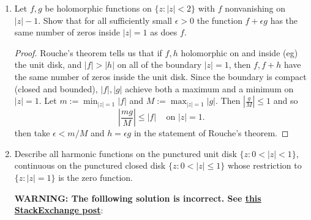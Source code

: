\documentclass{article}
\begin{document}
\begin{enumerate}
\begin{proof}
	The same computation shows that 
	\[ \left | \int_{C^+_{\epsilon}} f(z) dz \right | \leq \pi \epsilon^{5/4}/(\epsilon^2+1)\]
	as $\epsilon \rightarrow 0$, the numerator vanishes and the denominator $\rightarrow 1$.
	So
	\[ \pi i^{1/4} = \int_{\gamma_{\infty, 0}} f(z) dz = \int_{-\infty}^0 f dz + \int_0^\infty f dz \]
	A change of variables gives us 
	\[ \int_{-\infty}^0 f(z) dz = \int_{\infty}^0 f(-z) (-1) dz = \int_0^\infty f(-z) dz.\]
	But $f(-z) = (-1)^{1/4} f(z)$ so we get 
	\[ \pi i^{1/4} = \left ( (-1)^{1/4} _1 \right ) \int_0^\infty f(z) dz \]
	so 
	\begin{align*}
		\int_0^\infty f(z) dz = \pi i^{1/4}/ ((-1)^1/4 + 1) &= \pi \frac{i^{1/4}}{i^{1/2} +1}\\
		&=\pi/(i^{1/4} + i^{-1/4})
	\end{align*}
	But note that 
	\[i^{1/4} = \cos (\pi/8) + i \sin (\frac{\pi}{8})\]
	\[i^{-1/4} = \cos (\pi/8) - i \sin (\pi/8) \]
	so
	\[ \int_0^\infty f(z) dz = \boxed{\frac{\pi}{2 \cos(\pi/8)}}\]
	
	\end{proof}
	
	\item Let $f, g$ be holomorphic functions on $\{z : |z| < 2\}$ with $f$ nonvanishing on $|z| - 1$. 
	Show that for all sufficiently small $\epsilon > 0$ the function $f + \epsilon g$ has the same number of zeros inside $|z| = 1$ 
	as does $f$.
	
	\begin{proof}
	Rouche's theorem tells us that if $f,h$ holomorphic on and inside (eg) the unit disk, and $|f|>|h|$ on
	all of the boundary $|z|=1$, then $f, f+h$ have the same number of zeros inside the unit disk.
	Since the boundary is compact (closed and bounded), $|f|,|g|$ achieve both a maximum and a 
	minimum on $|z|=1$. Let $m:= \min_{|z|=1} |f|$ and $M:= \max_{|z|=1} |g|$. Then $|\frac{g}{M}| \leq 1$
	and so 
	\[ \left | \frac{mg}{M} \right | \leq |f| \;\;\; \text{ on } |z|=1.\]
	then take $\epsilon < m/M$ and $h = \epsilon g$ in the statement of Rouche's theorem.
	\end{proof}
	
	\item Describe all harmonic functions on the punctured unit disk $\{z : 0 < |z| < 1\}$, continuous on the punctured closed disk
	$\{z: 0 < |z| \leq 1\}$ whose restriction to $\{z: |z| = 1\}$ is the zero function.
	
	\textbf{WARNING: The folllowing solution is incorrect. See \href{https://math.stackexchange.com/questions/376677/characterization-of-harmonic-functions-on-the-punctured-disk}{this StackExchange post}}: 
	

\end{enumerate}
\end{document}
